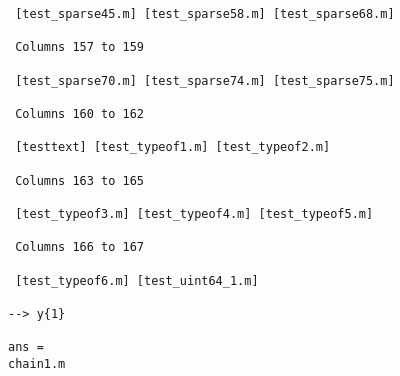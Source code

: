 \begin{verbatim}
 [test_sparse45.m] [test_sparse58.m] [test_sparse68.m] 

 Columns 157 to 159

 [test_sparse70.m] [test_sparse74.m] [test_sparse75.m] 

 Columns 160 to 162

 [testtext] [test_typeof1.m] [test_typeof2.m] 

 Columns 163 to 165

 [test_typeof3.m] [test_typeof4.m] [test_typeof5.m] 

 Columns 166 to 167

 [test_typeof6.m] [test_uint64_1.m] 

--> y{1}

ans = 
chain1.m
\end{verbatim}
